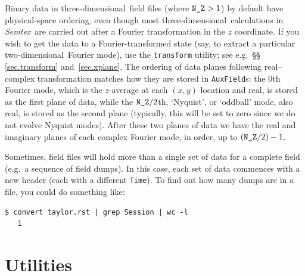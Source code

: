 \documentclass[11pt]{report}
\newcommand{\Semtex}{\emph{Semtex}} \newcommand{\Dog}{\emph{Dog}}
\newcommand\twod{two-di\-men\-sion\-al}
\newcommand\threed{three-di\-men\-sion\-al}
\newcommand{\eg}{e.g.\ } \newcommand{\CC}{\mathrm{c.c.}}
\begin{document}
Binary data in \threed\ field files (where $\verb|N_Z|>1$) by default
have physical-space ordering, even though most \threed\ calculations
in \Semtex\ are carried out after a Fourier transformation in the $z$
coordinate.  If you wish to get the data to a Fourier-transformed
state (say, to extract a particular \twod\ Fourier mode), use the
\texttt{transform} utility; see \eg \S\S\,\ref{sec.transform}
and~\ref{sec.xplane}.  The ordering of data planes following
real--complex transformation matches how they are stored in
\verb|AuxField|s: the $0$th Fourier mode, which is the $z$-average at
each $(x,y)$ location and real, is stored as the first plane of data,
while the $\verb|N_Z|/2$th, `Nyquist', or `oddball' mode, also real,
is stored as the second plane (typically, this will be set to zero
since we do not evolve Nyquist modes).  After these two planes of data
we have the real and imaginary planes of each complex Fourier mode, in
order, up to $(\verb|N_Z|/2)-1$.

Sometimes, field files will hold more than a single set of data for a
complete field (\eg a sequence of field dumps).  In this case, each
set of data commences with a new header (each with a different
\texttt{Time}).  To find out how many dumps are in a file, you could
do something like: {\small
\begin{verbatim}
$ convert taylor.rst | grep Session | wc -l
   1
\end{verbatim}
}


\section{Utilities}
\label{sec.utilities}
\end{document}
